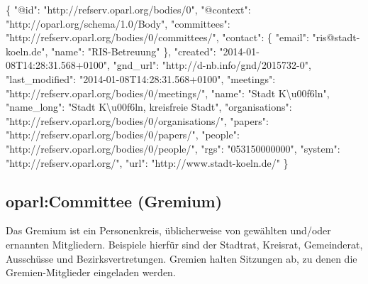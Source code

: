 \documentclass[,a4paper]{article}
\newenvironment{Shaded}{}{}
\newcommand{\DataTypeTok}[1]{\textcolor[rgb]{0.56,0.13,0.00}{{#1}}}
\newcommand{\StringTok}[1]{\textcolor[rgb]{0.25,0.44,0.63}{{#1}}}
\newcommand{\NormalTok}[1]{{#1}}
\begin{document}
\begin{Shaded}
\begin{Highlighting}[]
\NormalTok{\{}
    \DataTypeTok{"@id"}\NormalTok{: }\StringTok{"http://refserv.oparl.org/bodies/0"}\NormalTok{,}
    \DataTypeTok{"@context"}\NormalTok{: }\StringTok{"http://oparl.org/schema/1.0/Body"}\NormalTok{,}
    \DataTypeTok{"committees"}\NormalTok{: }\StringTok{"http://refserv.oparl.org/bodies/0/committees/"}\NormalTok{,}
    \DataTypeTok{"contact"}\NormalTok{: \{}
        \DataTypeTok{"email"}\NormalTok{: }\StringTok{"ris@stadt-koeln.de"}\NormalTok{,}
        \DataTypeTok{"name"}\NormalTok{: }\StringTok{"RIS-Betreuung"}
    \NormalTok{\}, }
    \DataTypeTok{"created"}\NormalTok{: }\StringTok{"2014-01-08T14:28:31.568+0100"}\NormalTok{,}
    \DataTypeTok{"gnd_url"}\NormalTok{: }\StringTok{"http://d-nb.info/gnd/2015732-0"}\NormalTok{,}
    \DataTypeTok{"last_modified"}\NormalTok{: }\StringTok{"2014-01-08T14:28:31.568+0100"}\NormalTok{,}
    \DataTypeTok{"meetings"}\NormalTok{: }\StringTok{"http://refserv.oparl.org/bodies/0/meetings/"}\NormalTok{,}
    \DataTypeTok{"name"}\NormalTok{: }\StringTok{"Stadt K\textbackslash{}u00f6ln"}\NormalTok{,}
    \DataTypeTok{"name_long"}\NormalTok{: }\StringTok{"Stadt K\textbackslash{}u00f6ln, kreisfreie Stadt"}\NormalTok{,}
    \DataTypeTok{"organisations"}\NormalTok{: }\StringTok{"http://refserv.oparl.org/bodies/0/organisations/"}\NormalTok{,}
    \DataTypeTok{"papers"}\NormalTok{: }\StringTok{"http://refserv.oparl.org/bodies/0/papers/"}\NormalTok{,}
    \DataTypeTok{"people"}\NormalTok{: }\StringTok{"http://refserv.oparl.org/bodies/0/people/"}\NormalTok{,}
    \DataTypeTok{"rgs"}\NormalTok{: }\StringTok{"053150000000"}\NormalTok{,}
    \DataTypeTok{"system"}\NormalTok{: }\StringTok{"http://refserv.oparl.org/"}\NormalTok{,}
    \DataTypeTok{"url"}\NormalTok{: }\StringTok{"http://www.stadt-koeln.de/"}
\NormalTok{\}}
\end{Highlighting}
\end{Shaded}

\subsection{oparl:Committee (Gremium)}

Das Gremium ist ein Personenkreis, üblicherweise von gewählten und/oder
ernannten Mitgliedern. Beispiele hierfür sind der Stadtrat, Kreisrat,
Gemeinderat, Ausschüsse und Bezirksvertretungen. Gremien halten
Sitzungen ab, zu denen die Gremien-Mitglieder eingeladen werden.
\end{document}
